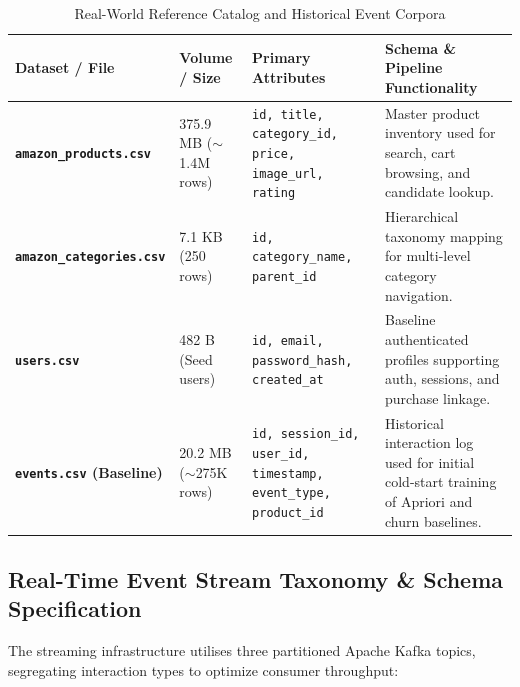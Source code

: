 \documentclass[11pt,a4paper]{article}
\begin{document}
\begin{table}[h]
\centering
\small
\begin{tabularx}{\textwidth}{@{}>{\bfseries}p{3.6cm}p{2.6cm}p{4.2cm}X@{}}
\toprule
\color{DeepNavy}Dataset / File & \color{DeepNavy}Volume / Size & \color{DeepNavy}Primary Attributes & \color{DeepNavy}Schema \& Pipeline Functionality \\
\midrule
\texttt{amazon\_products.csv} & 375.9 MB ($\sim$1.4M rows) & \texttt{id, title, category\_id, price, image\_url, rating} & Master product inventory used for search, cart browsing, and candidate lookup. \\
\addlinespace
\texttt{amazon\_categories.csv} & 7.1 KB (250 rows) & \texttt{id, category\_name, parent\_id} & Hierarchical taxonomy mapping for multi-level category navigation. \\
\addlinespace
\texttt{users.csv} & 482 B (Seed users) & \texttt{id, email, password\_hash, created\_at} & Baseline authenticated profiles supporting auth, sessions, and purchase linkage. \\
\addlinespace
\texttt{events.csv} (Baseline) & 20.2 MB ($\sim$275K rows) & \texttt{id, session\_id, user\_id, timestamp, event\_type, product\_id} & Historical interaction log used for initial cold-start training of Apriori and churn baselines. \\
\bottomrule
\end{tabularx}
\caption{Real-World Reference Catalog and Historical Event Corpora}
\end{table}

\subsection{Real-Time Event Stream Taxonomy \& Schema Specification}
The streaming infrastructure utilises three partitioned Apache Kafka topics, segregating interaction types to optimize consumer throughput:
\end{document}
